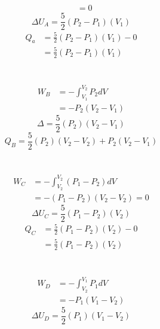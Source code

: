 \documentclass{article}
\begin{document}
\begin{enumerate}
\begin{enumerate}
\begin{align*}
                &= 0
            \end{align*}
            \begin{equation*}
                \Delta U_A = \frac{5}{2} (P_2 - P_1)(V_1)
            \end{equation*}
            \begin{align*}
                Q_a &= \frac{5}{2} (P_2 - P_1)(V_1) - 0 \\
                &= \frac{5}{2} (P_2 - P_1)(V_1)
            \end{align*}
            \\ \\
            \begin{align*}
                W_B &= - \int_{V_1}^{V_2} P_2 dV \\
                &=  -P_2(V_2 - V_1)
            \end{align*}
            \begin{equation*}
                \Delta = \frac{5}{2} (P_2)(V_2 - V_1)
            \end{equation*}
            \begin{equation*}
                Q_B = \frac{5}{2} (P_2)(V_2 - V_2) + P_2(V_2 - V_1)
            \end{equation*}
            \\ \\
            \begin{align*}
                W_C &= -\int_{V_2}^{V_2} (P_1 - P_2) dV \\
                &= - (P_1 - P_2)(V_2 - V_2) = 0
            \end{align*}
            \begin{equation*}
                \Delta U_C = \frac{5}{2} (P_1 - P_2)(V_2)
            \end{equation*}
            \begin{align*}
                Q_C &= \frac{5}{2} (P_1 - P_2)(V_2) - 0 \\
                &= \frac{5}{2} (P_1 - P_2)(V_2)
            \end{align*}
            \\ \\
            \begin{align*}
                W_D &= - \int_{V_2}^{V_1} P_1 dV \\
                &= - P_1(V_1 - V_2)
            \end{align*}
            \begin{equation*}
                \Delta U_D = \frac{5}{2}(P_1)(V_1 - V_2)

\end{equation*}
\end{enumerate}
\end{enumerate}
\end{document}
